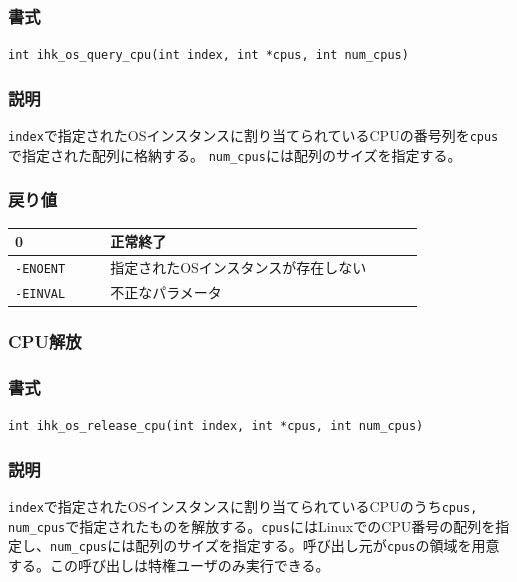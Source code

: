 \documentclass[twoside,11pt,fleqn]{book}
\begin{document}
\subsubsection{}
\subsubsection*{書式}{\quad} \texttt{int ihk\_os\_query\_cpu(int index, int *cpus, int num\_cpus)}
\subsubsection*{説明}{\quad} \texttt{index}で指定されたOSインスタンスに割り当てられているCPUの番号列を\texttt{cpus}で指定された配列に格納する。 \texttt{num\_cpus}には配列のサイズを指定する。
\subsubsection*{戻り値}
\begin{table}[!h]
\footnotesize
\begin{tabular}{|p{0.20\linewidth}|p{0.66\linewidth}|} \hline
0&正常終了\\ \hline
\texttt{-ENOENT}&指定されたOSインスタンスが存在しない\\ \hline
\texttt{-EINVAL}&不正なパラメータ\\ \hline
\end{tabular}
\vspace{-0em}
\end{table}
\FloatBarrier

\subsubsection{CPU解放}
\subsubsection*{書式}{\quad} \texttt{int ihk\_os\_release\_cpu(int index, int *cpus, int num\_cpus)}
\subsubsection*{説明}{\quad} \texttt{index}で指定されたOSインスタンスに割り当てられているCPUのうち\texttt{cpus, num\_cpus}で指定されたものを解放する。\texttt{cpus}にはLinuxでのCPU番号の配列を指定し、\texttt{num\_cpus}には配列のサイズを指定する。呼び出し元が\texttt{cpus}の領域を用意する。この呼び出しは特権ユーザのみ実行できる。
\end{document}
